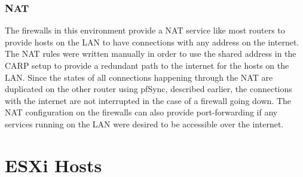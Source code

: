 \documentclass[12pt]{IEEEtran}
\begin{document}
\subsubsection{NAT}
The firewalls in this environment provide a NAT service like most routers to provide hosts on the LAN to have connections with any address on the internet. 
The NAT rules were written manually in order to use the shared address in the CARP setup to provide a redundant path to the internet for the hosts on the LAN.
Since the states of all connections happening through the NAT are duplicated on the other router using pfSync, described earlier, the connections with the internet are not interrupted in the case of a firewall going down. 
The NAT configuration on the firewalls can also provide port-forwarding if any services running on the LAN were desired to be accessible over the internet.  

\section{ESXi Hosts}

\end{document}
